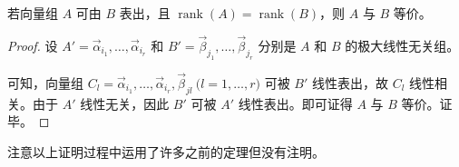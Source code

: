 \begin{theorem}
	若向量组 $A$ 可由 $B$ 表出，且 $\operatorname{rank}(A) = \operatorname{rank}(B)$，则 $A$ 与 $B$ 等价。
\end{theorem}

\begin{proof}
	设 $A' = \vec \alpha_{i_1}, \ldots, \vec \alpha_{i_r}$ 和 $B' = \vec \beta_{j_1}, \ldots, \vec \beta_{j_r}$ 分别是 $A$ 和 $B$ 的极大线性无关组。

	可知，向量组 $C_l = \vec \alpha_{i_1}, \ldots, \vec \alpha_{i_r}, \vec \beta_{jl} \pod{l = 1, \ldots, r}$ 可被 $B'$ 线性表出，故 $C_l$ 线性相关。由于 $A'$ 线性无关，因此 $B'$ 可被 $A'$ 线性表出。即可证得 $A$ 与 $B$ 等价。证毕。
\end{proof}

注意以上证明过程中运用了许多之前的定理但没有注明。